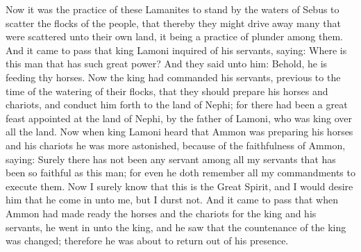 Now it was the practice of these Lamanites to stand by the waters of Sebus to scatter the flocks of the people, that thereby they might drive away many that were scattered unto their own land, it being a practice of plunder among them.
\bverse \iffalse And it came to pass that king Lamoni inquired of his servants, saying: Where is this man that has such great power? \fi
And it came to pass that king Lamoni inquired of his servants, saying: Where is this man that has such great power?
\bverse \iffalse And they said unto him: Behold, he is feeding thy horses. Now the king had commanded his servants, previous to the time of the watering of their flocks, that they should prepare his horses and chariots, and conduct him forth to the land of Nephi; for there had been a great feast appointed at the land of Nephi, by the father of Lamoni, who was king over all the land. \fi
And they said unto him: Behold, he is feeding thy horses. Now the king had commanded his servants, previous to the time of the watering of their flocks, that they should prepare his horses and chariots, and conduct him forth to the land of Nephi; for there had been a great feast appointed at the land of Nephi, by the father of Lamoni, who was king over all the land.
\bverse \iffalse Now when king Lamoni heard that Ammon was preparing his horses and his chariots he was more astonished, because of the faithfulness of Ammon, saying: Surely there has not been any servant among all my servants that has been so faithful as this man; for even he doth remember all my commandments to execute them. \fi
Now when king Lamoni heard that Ammon was preparing his horses and his chariots he was more astonished, because of the faithfulness of Ammon, saying: Surely there has not been any servant among all my servants that has been so faithful as this man; for even he doth remember all my commandments to execute them.
\bverse \iffalse Now I surely know that this is the Great Spirit, and I would desire him that he come in unto me, but I durst not. \fi
Now I surely know that this is the Great Spirit, and I would desire him that he come in unto me, but I durst not.
\bverse \iffalse And it came to pass that when Ammon had made ready the horses and the chariots for the king and his servants, he went in unto the king, and he saw that the countenance of the king was changed; therefore he was about to return out of his presence. \fi
And it came to pass that when Ammon had made ready the horses and the chariots for the king and his servants, he went in unto the king, and he saw that the countenance of the king was changed; therefore he was about to return out of his presence.
